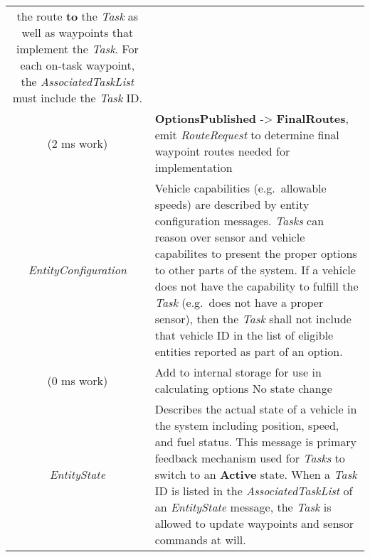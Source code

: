 \begin{longtable}[]{@{}cl@{}}
\begin{minipage}[t]{0.55\columnwidth}
the route \textbf{to} the \emph{Task} as well as waypoints that
implement the \emph{Task}. For each on-task waypoint, the
\emph{AssociatedTaskList} must include the \emph{Task} ID.\strut
\end{minipage}\tabularnewline
\begin{minipage}[t]{0.40\columnwidth}\centering\strut
(2 ms work)\strut
\end{minipage} & \begin{minipage}[t]{0.55\columnwidth}\raggedright\strut
\textbf{OptionsPublished} -\textgreater{} \textbf{FinalRoutes}, emit
\emph{RouteRequest} to determine final waypoint routes needed for
implementation\strut
\end{minipage}\tabularnewline
\begin{minipage}[t]{0.40\columnwidth}\centering\strut
\emph{EntityConfiguration}\strut
\end{minipage} & \begin{minipage}[t]{0.55\columnwidth}\raggedright\strut
Vehicle capabilities (e.g.~allowable speeds) are described by entity
configuration messages. \emph{Tasks} can reason over sensor and vehicle
capabilites to present the proper options to other parts of the system.
If a vehicle does not have the capability to fulfill the \emph{Task}
(e.g.~does not have a proper sensor), then the \emph{Task} shall not
include that vehicle ID in the list of eligible entities reported as
part of an option.\strut
\end{minipage}\tabularnewline
\begin{minipage}[t]{0.40\columnwidth}\centering\strut
(0 ms work)\strut
\end{minipage} & \begin{minipage}[t]{0.55\columnwidth}\raggedright\strut
Add to internal storage for use in calculating options No state
change\strut
\end{minipage}\tabularnewline
\begin{minipage}[t]{0.40\columnwidth}\centering\strut
\emph{EntityState}\strut
\end{minipage} & \begin{minipage}[t]{0.55\columnwidth}\raggedright\strut
Describes the actual state of a vehicle in the system including
position, speed, and fuel status. This message is primary feedback
mechanism used for \emph{Tasks} to switch to an \textbf{Active} state.
When a \emph{Task} ID is listed in the \emph{AssociatedTaskList} of an
\emph{EntityState} message, the \emph{Task} is allowed to update
waypoints and sensor commands at will.\strut

\end{minipage}
\end{longtable}
